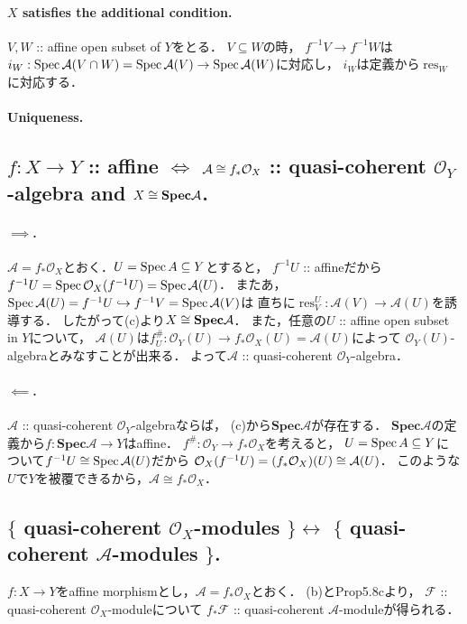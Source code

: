 \documentclass[a4paper]{jsarticle}
\newcommand{\shA}{\mathcal{A}}
\newcommand{\shF}{\mathcal{F}}
\newcommand{\shO}{\mathcal{O}}
\newcommand{\res}{\operatorname{res}}
\newcommand{\bfSpec}{\mathbf{Spec}}
\begin{document}
    \paragraph{$X$ satisfies the additional condition.}
    $V, W$ :: affine open subset of $Y$をとる．
    $V \subseteq W$の時，
    $f^{-1}V \to f^{-1}W$は$i_W: \Spec \shA(V \cap W)=\Spec \shA(V) \to \Spec \shA(W)$に対応し，
    $i_W$は定義から$\res_W$に対応する．

    \paragraph{Uniqueness.}

    \subsection{$f: X \to Y$ :: affine $\iff$
        $\shA \iso f_* \shO_X$ :: quasi-coherent $\shO_Y$-algebra and $X \iso \bfSpec \shA$.}

    \paragraph{$\implies$.}
    $\shA=f_* \shO_X$とおく．$U=\operatorname{Spec} A \subseteq Y$とすると，
    $f^{-1}U$ :: affineだから$f^{-1}U=\Spec \shO_X(f^{-1}U)=\Spec \shA(U)$．
    またあ，$\Spec \shA(U)=f^{-1}U \hookrightarrow f^{-1}V=\Spec \shA(V)$は
    直ちに$\res_V^U: \shA(V) \to \shA(U)$を誘導する．
    したがって(c)より$X \iso \bfSpec \shA$．
    また，任意の$U$ :: affine open subset in $Y$について，
    $\shA(U)$は$f^{\#}_U: \shO_Y(U) \to f_*\shO_X(U)=\shA(U)$によって
    $\shO_Y(U)$-algebraとみなすことが出来る．
    よって$\shA$ :: quasi-coherent $\shO_Y$-algebra．

    \paragraph{$\impliedby$.}
    $\shA$ :: quasi-coherent $\shO_Y$-algebraならば，
    (c)から$\bfSpec \shA$が存在する．
    $\bfSpec \shA$の定義から$f: \bfSpec \shA \to Y$はaffine．
    $f^{\#}: \shO_Y \to f_*\shO_X$を考えると，
    $U=\operatorname{Spec} A \subseteq Y$について$f^{-1}U \iso \Spec \shA(U)$だから
    $\shO_X(f^{-1}U)=(f_*\shO_X)(U) \iso \shA(U)$．
    このような$U$で$Y$を被覆できるから，$\shA \cong f_*\shO_X$．

    \subsection{$\{$ quasi-coherent $\shO_X$-modules $\} \leftrightarrow$ $\{$ quasi-coherent $\shA$-modules $\}$.}
    $f: X \to Y$をaffine morphismとし，$\shA=f_*\shO_X$とおく．
    (b)とProp5.8cより，
    $\shF$ :: quasi-coherent $\shO_X$-moduleについて
    $f_* \shF$ :: quasi-coherent $\shA$-moduleが得られる．
\end{document}
